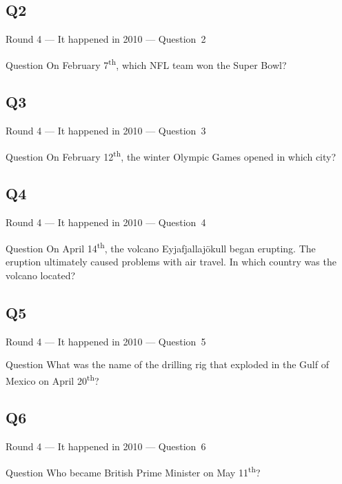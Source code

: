 \documentclass[11pt,draft]{beamer}
\begin{document}
\subsection*{Q2}
\begin{frame}[t]{Round 4 --- It happened in 2010 --- \mbox{Question 2}}
    \begin{block}{Question}
        On February 7\textsuperscript{th}, which NFL  team won the Super Bowl?
    \end{block}
\end{frame}
\subsection*{Q3}
\begin{frame}[t]{Round 4 --- It happened in 2010 --- \mbox{Question 3}}
    \begin{block}{Question}
        On February 12\textsuperscript{th}, the winter Olympic Games opened in which city?
    \end{block}
\end{frame}
\subsection*{Q4}
\begin{frame}[t]{Round 4 --- It happened in 2010 --- \mbox{Question 4}}
    \begin{block}{Question}
        On April 14\textsuperscript{th}, the volcano Eyjafjallajökull began erupting. The eruption ultimately caused problems with air travel. In which country was the volcano located?
    \end{block}
\end{frame}
\subsection*{Q5}
\begin{frame}[t]{Round 4 --- It happened in 2010 --- \mbox{Question 5}}
    \begin{block}{Question}
        What was the name of the drilling rig that exploded in the Gulf of Mexico on April 20\textsuperscript{th}?
    \end{block}
\end{frame}
\subsection*{Q6}
\begin{frame}[t]{Round 4 --- It happened in 2010 --- \mbox{Question 6}}
    \begin{block}{Question}
        Who became British Prime Minister on May 11\textsuperscript{th}?
    \end{block}
\end{frame}
\end{document}
